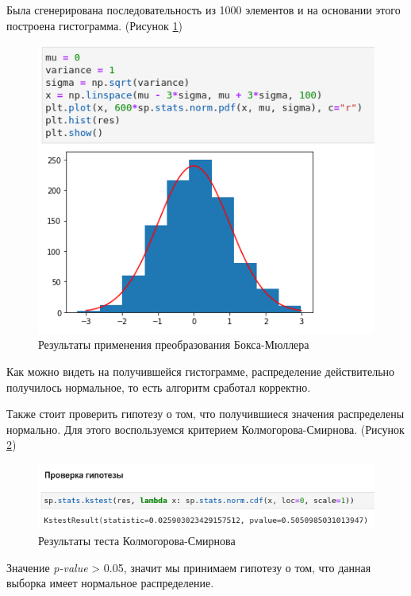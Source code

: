 \documentclass[14pt,fleqn]{extarticle}
\begin{document}
	Была сгенерирована последовательность из 1000 элементов и на основании этого построена гистограмма. (Рисунок \ref{fig:box_muller_transform_result})

	\begin{figure}[h]
		\centering \includegraphics[scale=0.6]{box_muller_transform_result}
		\caption{Результаты применения преобразования Бокса-Мюллера}
		\label{fig:box_muller_transform_result}
	\end{figure}
	
	Как можно видеть на получившейся гистограмме, распределение действительно получилось нормальное, то есть алгоритм сработал корректно.
	
	\newpage
   	Также стоит проверить гипотезу о том, что получившиеся значения распределены нормально. Для этого воспользуемся критерием Колмогорова-Смирнова. (Рисунок \ref{fig:box_muller_transform_test})
	\begin{figure}[h]
		\centering \includegraphics[scale=0.6]{box_muller_transform_test}
		\caption{Результаты теста Колмогорова-Смирнова}
		\label{fig:box_muller_transform_test}
	\end{figure}
	
	Значение \textit{p-value} > 0.05, значит мы принимаем гипотезу о том, что данная выборка имеет нормальное распределение.
	
\end{document}
